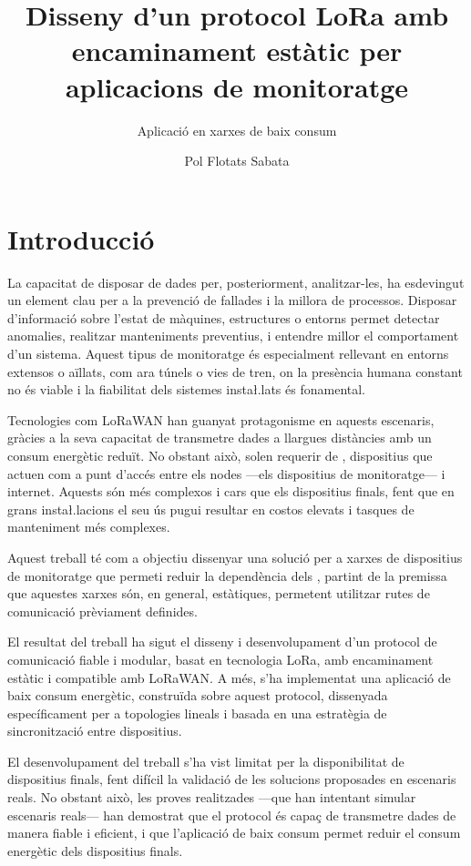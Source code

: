 \documentclass{tfgitic}[2024/07/01]
\title{Disseny d'un protocol LoRa amb encaminament estàtic per aplicacions de monitoratge}
\subtitle{Aplicació en xarxes de baix consum}
\author{Pol Flotats Sabata}
\begin{document}
\listoffigures

\chapter{Introducció}

La capacitat de disposar de dades per, posteriorment, analitzar-les, ha esdevingut un element clau per a la prevenció de fallades i la millora de processos. Disposar d'informació sobre l'estat de màquines, estructures o entorns permet detectar anomalies, realitzar manteniments preventius, i entendre millor el comportament d'un sistema. Aquest tipus de monitoratge és especialment rellevant en entorns extensos o aïllats, com ara túnels o vies de tren, on la presència humana constant no és viable i la fiabilitat dels sistemes insta\l.lats és fonamental.

Tecnologies com LoRaWAN han guanyat protagonisme en aquests escenaris, gràcies a la seva capacitat de transmetre dades a llargues distàncies amb un consum energètic reduït. No obstant això, solen requerir de , dispositius que actuen com a punt d'accés entre els nodes ---els dispositius de monitoratge--- i internet. Aquests  són més complexos i cars que els dispositius finals, fent que en grans insta\l.lacions el seu ús pugui resultar en costos elevats i tasques de manteniment més complexes.

Aquest treball té com a objectiu dissenyar una solució per a xarxes de dispositius de monitoratge que permeti reduir la dependència dels , partint de la premissa que aquestes xarxes són, en general, estàtiques, permetent utilitzar rutes de comunicació prèviament definides. 

El resultat del treball ha sigut el disseny i desenvolupament d'un protocol de comunicació fiable i modular, basat en tecnologia LoRa, amb encaminament estàtic i compatible amb LoRaWAN. A més, s'ha implementat una aplicació de baix consum energètic, construïda sobre aquest protocol, dissenyada específicament per a topologies lineals i basada en una estratègia de sincronització entre dispositius. 

El desenvolupament del treball s'ha vist limitat per la disponibilitat de dispositius finals, fent difícil la validació de les solucions proposades en escenaris reals. No obstant això, les proves realitzades ---que han intentant simular escenaris reals--- han demostrat que el protocol és capaç de transmetre dades de manera fiable i eficient, i que l'aplicació de baix consum permet reduir el consum energètic dels dispositius finals.
\end{document}
